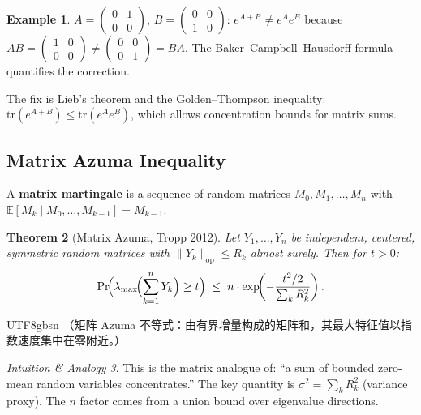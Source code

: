 \documentclass[12pt]{article}
\newtheorem{theorem}{Theorem}[section]
\theoremstyle{definition}
\newtheorem{example}[theorem]{Example}
\theoremstyle{remark}
\newtheorem{intuition}[theorem]{Intuition \& Analogy}
\begin{document}
\begin{example}
$A = \begin{pmatrix}0&1\\0&0\end{pmatrix}$, $B = \begin{pmatrix}0&0\\1&0\end{pmatrix}$:
$e^{A+B} \ne e^A e^B$ because $AB = \begin{pmatrix}1&0\\0&0\end{pmatrix} \ne
\begin{pmatrix}0&0\\0&1\end{pmatrix} = BA$.
The Baker--Campbell--Hausdorff formula quantifies the correction.
\end{example}

The fix is Lieb's theorem and the Golden--Thompson inequality:
$\mathrm{tr}(e^{A+B}) \le \mathrm{tr}(e^A e^B)$,
which allows concentration bounds for matrix sums.

\subsection{Matrix Azuma Inequality}

A \textbf{matrix martingale} is a sequence of random matrices $M_0, M_1, \ldots, M_n$
with $\mathbb{E}[M_k \mid M_0,\ldots,M_{k-1}] = M_{k-1}$.

\begin{theorem}[Matrix Azuma, Tropp 2012]\label{thm:mazuma}
Let $Y_1, \ldots, Y_n$ be independent, centered, symmetric random matrices with
$\|Y_k\|_{\mathrm{op}} \le R_k$ almost surely.  Then for $t > 0$:
\[
  \Pr\!\Bigl(\lambda_{\max}\!\Bigl(\sum_{k=1}^n Y_k\Bigr) \ge t\Bigr)
  \;\le\; n \cdot \exp\!\!\left(-\frac{t^2/2}{\sum_k R_k^2}\right).
\]
\end{theorem}

\begin{CJK}{UTF8}{gbsn}
（矩阵 Azuma 不等式：由有界增量构成的矩阵和，其最大特征值以指数速度集中在零附近。）
\end{CJK}

\begin{intuition}
This is the matrix analogue of: ``a sum of bounded zero-mean random variables concentrates.''
The key quantity is $\sigma^2 = \sum_k R_k^2$ (variance proxy).
The $n$ factor comes from a union bound over eigenvalue directions.
\end{intuition}
\end{document}
